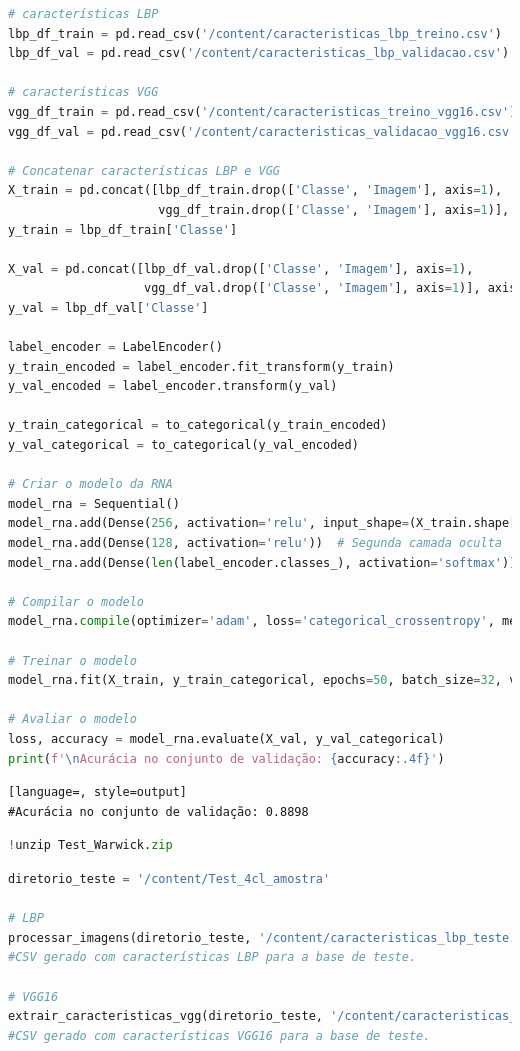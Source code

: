 \begin{lstlisting}[language=Python, style=input]
# características LBP
lbp_df_train = pd.read_csv('/content/caracteristicas_lbp_treino.csv')
lbp_df_val = pd.read_csv('/content/caracteristicas_lbp_validacao.csv')

# características VGG
vgg_df_train = pd.read_csv('/content/caracteristicas_treino_vgg16.csv')
vgg_df_val = pd.read_csv('/content/caracteristicas_validacao_vgg16.csv')

# Concatenar características LBP e VGG
X_train = pd.concat([lbp_df_train.drop(['Classe', 'Imagem'], axis=1),
                     vgg_df_train.drop(['Classe', 'Imagem'], axis=1)], axis=1)
y_train = lbp_df_train['Classe']

X_val = pd.concat([lbp_df_val.drop(['Classe', 'Imagem'], axis=1),
                   vgg_df_val.drop(['Classe', 'Imagem'], axis=1)], axis=1)
y_val = lbp_df_val['Classe']

label_encoder = LabelEncoder()
y_train_encoded = label_encoder.fit_transform(y_train)
y_val_encoded = label_encoder.transform(y_val)

y_train_categorical = to_categorical(y_train_encoded)
y_val_categorical = to_categorical(y_val_encoded)

# Criar o modelo da RNA
model_rna = Sequential()
model_rna.add(Dense(256, activation='relu', input_shape=(X_train.shape[1],)))  # Primeira camada oculta
model_rna.add(Dense(128, activation='relu'))  # Segunda camada oculta
model_rna.add(Dense(len(label_encoder.classes_), activation='softmax'))  # Camada de saída com softmax

# Compilar o modelo
model_rna.compile(optimizer='adam', loss='categorical_crossentropy', metrics=['accuracy'])

# Treinar o modelo
model_rna.fit(X_train, y_train_categorical, epochs=50, batch_size=32, validation_data=(X_val, y_val_categorical))

# Avaliar o modelo
loss, accuracy = model_rna.evaluate(X_val, y_val_categorical)
print(f'\nAcurácia no conjunto de validação: {accuracy:.4f}')
\end{lstlisting}
\begin{lstlisting}[language=, style=output]
#Acurácia no conjunto de validação: 0.8898
\end{lstlisting}

\begin{lstlisting}[language=Python, style=input]
!unzip Test_Warwick.zip
\end{lstlisting}
\begin{lstlisting}[language=Python, style=input]
diretorio_teste = '/content/Test_4cl_amostra'

# LBP
processar_imagens(diretorio_teste, '/content/caracteristicas_lbp_teste.csv')
#CSV gerado com características LBP para a base de teste.

# VGG16
extrair_caracteristicas_vgg(diretorio_teste, '/content/caracteristicas_vgg16_teste.csv')
#CSV gerado com características VGG16 para a base de teste.
\end{lstlisting}

